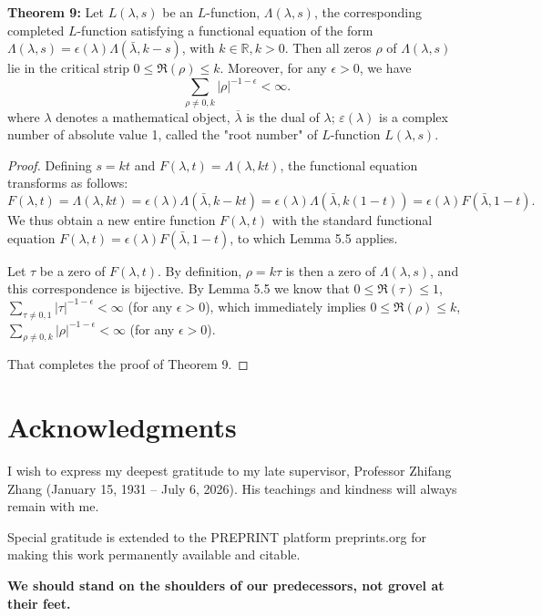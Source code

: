 \documentclass[12pt]{article}
\begin{document}
\textbf{Theorem 9:} Let $L(\lambda, s)$ be an $L$-function,  \( \Lambda(\lambda, s) \), the corresponding completed \( L \)-function satisfying a functional equation of the form \( \Lambda(\lambda, s) = \epsilon(\lambda) \Lambda(\bar{\lambda}, k-s)\), with \( k\in \mathbb{R}, k > 0 \). Then all zeros \( \rho \) of \( \Lambda(\lambda, s) \) lie in the critical strip \( 0 \leq \Re(\rho) \leq k \). Moreover, for any \( \epsilon > 0 \), we have
\[
\sum_{\rho \neq 0, k} |\rho|^{-1-\epsilon} < \infty.
\]
where $\lambda$ denotes a mathematical object, $\overline\lambda$ is the dual of $\lambda$; $\varepsilon(\lambda)$ is a complex number of absolute value 1, called the "root number" of $L$-function $L(\lambda, s)$.
\begin{proof}
Defining \( s = kt \) and \( F(\lambda, t) = \Lambda(\lambda, k t) \), the functional equation transforms as follows:
\[
F(\lambda, t) = \Lambda(\lambda, k t) = \epsilon(\lambda) \Lambda(\bar{\lambda}, k - k t) = \epsilon(\lambda) \Lambda(\bar{\lambda}, k(1-t)) = \epsilon(\lambda) F(\bar\lambda, 1-t).
\]
We thus obtain a new entire function \( F(\lambda, t) \) with the standard functional equation \( F(\lambda, t) = \epsilon(\lambda) F(\bar{\lambda}, 1-t) \), to which Lemma 5.5 applies.

Let \( \tau \) be a zero of \( F(\lambda, t) \). By definition, \( \rho = k \tau \) is then a zero of \( \Lambda(\lambda, s) \), and this correspondence is bijective. By Lemma 5.5 we know that \( 0 \leq \Re(\tau) \leq 1 \), \( \sum_{\tau\neq 0, 1} |\tau|^{-1-\epsilon} < \infty \) (for any \( \epsilon > 0 \)), which immediately implies \( 0 \leq \Re(\rho) \leq k \), \( \sum_{\rho\neq 0, k} |\rho|^{-1-\epsilon} < \infty \) (for any \( \epsilon > 0 \)).

That completes the proof of Theorem 9.
\end{proof}


\section*{Acknowledgments}

I wish to express my deepest gratitude to my late supervisor, Professor Zhifang Zhang (January 15, 1931 – July 6, 2026). His teachings and kindness will always remain with me.

Special gratitude is extended to the PREPRINT platform preprints.org for making this work permanently available and citable.

\textbf{We should stand on the shoulders of our predecessors, not grovel at their feet.}
\end{document}
